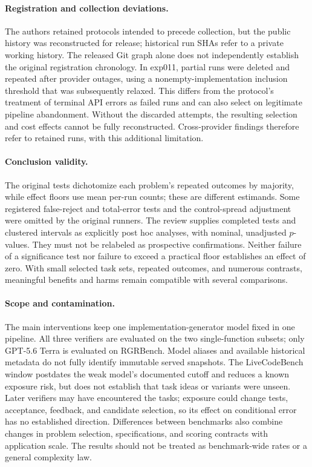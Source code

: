 \paragraph{Registration and collection deviations.} The authors retained protocols intended to
precede collection, but the public history was reconstructed for release; historical run SHAs
refer to a private working history. The released Git graph alone does not independently establish
the original registration chronology. In exp011, partial runs were deleted and repeated after
provider outages, using a nonempty-implementation inclusion threshold that was subsequently
relaxed. This differs from the protocol's treatment of terminal API errors as failed runs and can
also select on legitimate pipeline abandonment. Without the discarded attempts, the resulting
selection and cost effects cannot be fully reconstructed. Cross-provider findings therefore
refer to retained runs, with this additional limitation.

\paragraph{Conclusion validity.} The original tests dichotomize each problem's repeated outcomes
by majority, while effect floors use mean per-run counts; these are different estimands. Some
registered false-reject and total-error tests and the control-spread adjustment were omitted by
the original runners. The review supplies completed tests and clustered intervals as explicitly
post hoc analyses, with nominal, unadjusted $p$-values. They must not be relabeled as prospective
confirmations. Neither failure of a significance test nor failure to exceed a practical floor
establishes an effect of zero. With small selected task sets, repeated outcomes, and numerous
contrasts, meaningful benefits and harms remain compatible with several comparisons.

\paragraph{Scope and contamination.} The main interventions keep one implementation-generator
model fixed in one pipeline. All three verifiers are evaluated on the two single-function
subsets; only GPT-5.6 Terra is evaluated on RGRBench. Model aliases and available historical
metadata do not fully identify immutable served snapshots. The LiveCodeBench window postdates
the weak model's documented cutoff and reduces a known exposure risk, but does not establish
that task ideas or variants were unseen. Later verifiers may have encountered the tasks;
exposure could change tests, acceptance, feedback, and candidate selection, so its effect on
conditional error has no established direction. Differences between benchmarks also combine
changes in problem selection, specifications, and scoring contracts with application scale.
The results should not be treated as benchmark-wide rates or a general complexity law.

